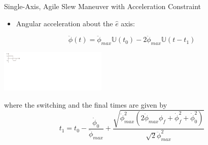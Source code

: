 \documentclass{beamer}
\begin{document}
\begin{frame}
\begin{block}{ Single-Axis, Agile Slew Maneuver with Acceleration Constraint}

\begin{itemize}
	\item Angular acceleration about the $\hat{e}$ axis:
\end{itemize}
\begin{equation}\label{alpha}
\ddot{\phi}(t)=\ddot{\phi}_{max}\mathbb{U}(t_0)- 2\ddot{\phi}_{max}\mathbb{U}(t-t_1)
\end{equation}

\begin{center}
\includegraphics[width=2in]{./Figures/Bang_bang}      
\end{center}

where the switching and the final times are given by
\begin{equation}
t_1=t_0-\frac{\dot{\phi}_{0}}{\ddot{\phi}_{max}}+\frac{\sqrt{\ddot{\phi}_{max}^2(2\ddot{\phi}_{max}\phi_{f}+\dot{\phi}_{f}^2+\dot{\phi}_{0}^2)}}{\sqrt{2}\ddot{\phi}_{max}^2}
\end{equation}


\end{block}
\end{frame}
\end{document}
